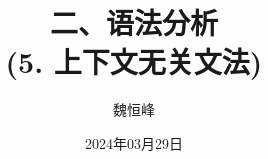 \documentclass[]{beamer}
\title[语法分析]{二、语法分析 \\ (5. 上下文无关文法)}
\author[魏恒峰]{\large 魏恒峰}
\institute{hfwei@nju.edu.cn}
\date{2024年03月29日}
\begin{document}
\maketitle



\thankyou{}

\end{document}
